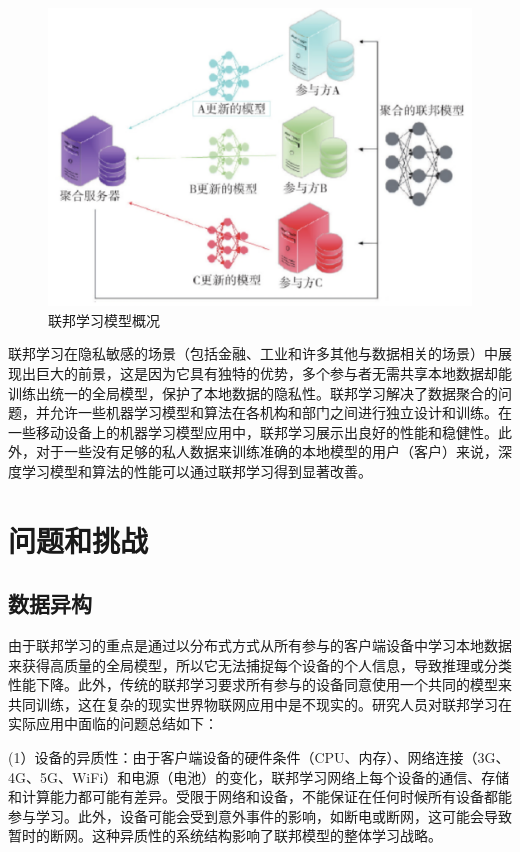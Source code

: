 \begin{figure}[!hbt]
\centering
	\includegraphics[scale=0.5]{fig2/C1/联邦学习概况}%
	\caption{联邦学习模型概况}
	\label{fig:联邦学习模型概况}	
\end{figure}

联邦学习在隐私敏感的场景（包括金融、工业和许多其他与数据相关的场景）中展现出巨大的前景，这是因为它具有独特的优势，多个参与者无需共享本地数据却能训练出统一的全局模型，保护了本地数据的隐私性。联邦学习解决了数据聚合的问题，并允许一些机器学习模型和算法在各机构和部门之间进行独立设计和训练。在一些移动设备上的机器学习模型应用中，联邦学习展示出良好的性能和稳健性。此外，对于一些没有足够的私人数据来训练准确的本地模型的用户（客户）来说，深度学习模型和算法的性能可以通过联邦学习得到显著改善。

\section {问题和挑战}
\subsection{数据异构}
由于联邦学习的重点是通过以分布式方式从所有参与的客户端设备中学习本地数据来获得高质量的全局模型，所以它无法捕捉每个设备的个人信息，导致推理或分类性能下降。此外，传统的联邦学习要求所有参与的设备同意使用一个共同的模型来共同训练，这在复杂的现实世界物联网应用中是不现实的。研究人员对联邦学习在实际应用中面临的问题总结如下：

(1）设备的异质性：由于客户端设备的硬件条件（CPU、内存）、网络连接（3G、4G、5G、WiFi）和电源（电池）的变化，联邦学习网络上每个设备的通信、存储和计算能力都可能有差异。受限于网络和设备，不能保证在任何时候所有设备都能参与学习。此外，设备可能会受到意外事件的影响，如断电或断网，这可能会导致暂时的断网。这种异质性的系统结构影响了联邦模型的整体学习战略。

